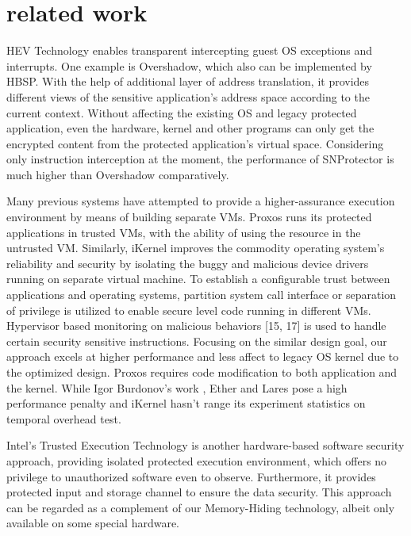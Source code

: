 \documentclass[conference]{IEEEtran}
\begin{document}
{\bigskip

\section{related work}
HEV Technology enables transparent intercepting guest OS exceptions
and interrupts. One example is Overshadow\cite{IEEEhowto:6}, which
also can be implemented by HBSP. With the help of additional layer
of address translation, it provides different views of the sensitive
application's address space according to the current context.
Without affecting the existing OS and legacy protected application,
even the hardware, kernel and other programs can only get the
encrypted content from the protected application's virtual space.
Considering only instruction interception at the moment, the
performance of SNProtector is much higher than Overshadow
comparatively.

Many previous systems have attempted to provide a higher-assurance
execution environment by means of building separate VMs.
Proxos\cite{IEEEhowto:12} runs its protected applications in trusted
VMs, with the ability of using the resource in the untrusted VM.
Similarly, iKernel\cite{IEEEhowto:13} improves the commodity
operating system's reliability and security by isolating the buggy
and malicious device drivers running on separate virtual machine. To
establish a configurable trust between applications and operating
systems, partition system call interface  or separation of
privilege\cite{IEEEhowto:15} is utilized to enable secure level code
running in different VMs. Hypervisor based monitoring on malicious
behaviors [15, 17] is used to handle certain security sensitive
instructions. Focusing on the similar design goal, our approach
excels at higher performance and less affect to legacy OS kernel due
to the optimized design. Proxos \cite{IEEEhowto:12} requires code
modification to both application and the kernel. While Igor
Burdonov's work \cite{IEEEhowto:15}, Ether \cite{IEEEhowto:16} and
Lares \cite{IEEEhowto:18} pose a high performance penalty and
iKernel \cite{IEEEhowto:13} hasn't range its experiment statistics
on temporal overhead test.

Intel's Trusted Execution Technology\cite{IEEEhowto:17} is another
hardware-based software security approach, providing isolated
protected execution environment, which offers no privilege to
unauthorized software even to observe. Furthermore, it provides
protected input and storage channel to ensure the data security.
This approach can be regarded as a complement of our Memory-Hiding
technology, albeit only available on some special hardware.

}
\end{document}
